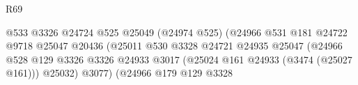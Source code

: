 \begin{lexlean}{R69}
\begin{coremodule}
                                                              @533
                                                              @3326
                                                              @24724
                                                              @525
                                                              @25049
                                                              (@24974 @525)
                                                              (@24966
                                                                @531
                                                                @181
                                                                @24722
                                                                @9718
                                                                @25047
                                                                @20436
                                                                (@25011
                                                                  @530
                                                                  @3328
                                                                  @24721
                                                                  @24935
                                                                  @25047
                                                                  (@24966
                                                                    @528
                                                                    @129
                                                                    @3326
                                                                    @3326
                                                                    @24933
                                                                    @3017
                                                                    (@25024
                                                                      @161
                                                                      @24933
                                                                      (@3474 (@25027 @161)))
                                                                    @25032)
                                                                  @3077)
                                                                (@24966
                                                                  @179
                                                                  @129
                                                                  @3328

\end{coremodule}
\end{lexlean}
